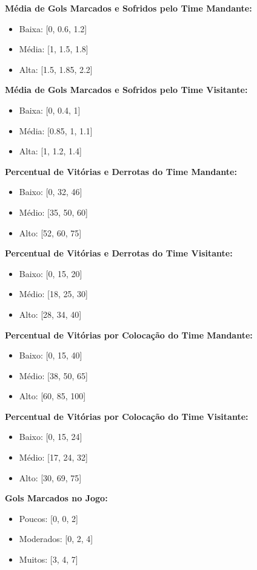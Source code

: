 \documentclass[conference]{IEEEtran}
\begin{document}
\textbf{Média de Gols Marcados e Sofridos pelo Time Mandante:}
\begin{itemize}
    \item Baixa: [0, 0.6, 1.2]
    \item Média: [1, 1.5, 1.8]
    \item Alta: [1.5, 1.85, 2.2]
\end{itemize}

\textbf{Média de Gols Marcados e Sofridos pelo Time Visitante:}
\begin{itemize}
    \item Baixa: [0, 0.4, 1]
    \item Média: [0.85, 1, 1.1]
    \item Alta: [1, 1.2, 1.4]
\end{itemize}

\textbf{Percentual de Vitórias e Derrotas do Time Mandante:}
\begin{itemize}
    \item Baixo: [0, 32, 46]
    \item Médio: [35, 50, 60]
    \item Alto: [52, 60, 75]
\end{itemize}

\textbf{Percentual de Vitórias e Derrotas do Time Visitante:}
\begin{itemize}
    \item Baixo: [0, 15, 20]
    \item Médio: [18, 25, 30]
    \item Alto: [28, 34, 40]
\end{itemize}

\textbf{Percentual de Vitórias por Colocação do Time Mandante:}
\begin{itemize}
    \item Baixo: [0, 15, 40]
    \item Médio: [38, 50, 65]
    \item Alto: [60, 85, 100]
\end{itemize}

\textbf{Percentual de Vitórias por Colocação do Time Visitante:}
\begin{itemize}
    \item Baixo: [0, 15, 24]
    \item Médio: [17, 24, 32]
    \item Alto: [30, 69, 75]
\end{itemize}

\textbf{Gols Marcados no Jogo:}
\begin{itemize}
    \item Poucos: [0, 0, 2]
    \item Moderados: [0, 2, 4]
    \item Muitos: [3, 4, 7]
\end{itemize}
\end{document}
